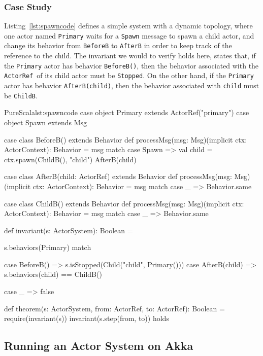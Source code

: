 \documentclass[a4paper,twoside]{article}
\newcommand{\InlineS}[1]{\lstinline[language=PureScala,basicstyle=\small\ttfamily,columns=fixed]|#1|}
\newcommand{\RefCode}[1]{Listing~\ref{#1}}
\newcommand{\ActorRef}{\InlineS{ActorRef}\ }
\newcommand{\stt}[1]{\texttt{\small{#1}}}
\begin{document}
\subsubsection{Case Study}

\RefCode{lst:spawncode} defines a simple system with a dynamic topology, where one actor named \stt{Primary} waits for a \stt{Spawn} message to spawn a child actor, and change its behavior from \stt{BeforeB} to \stt{AfterB} in order to keep track of the reference to the child. The invariant we would to verify holds here, states that, if the \stt{Primary} actor has behavior \stt{BeforeB()}, then the behavior associated with the \ActorRef of its child actor must be \stt{Stopped}. On the other hand, if the \stt{Primary} actor has behavior \stt{AfterB(child)}, then the behavior associated with \stt{child} must be \stt{ChildB}.

\begin{Code}{PureScala}{lst:spawncode}{}
case object Primary extends ActorRef("primary")
case object Spawn extends Msg

case class BeforeB() extends Behavior {
  def processMsg(msg: Msg)(implicit ctx: ActorContext): Behavior = msg match {
    case Spawn =>
      val child = ctx.spawn(ChildB(), "child")
      AfterB(child)
  }
}

case class AfterB(child: ActorRef) extends Behavior {
  def processMsg(msg: Msg)(implicit ctx: ActorContext): Behavior = msg match {
    case _ => Behavior.same
  }
}

case class ChildB() extends Behavior {
  def processMsg(msg: Msg)(implicit ctx: ActorContext): Behavior = msg match {
    case _ => Behavior.same
  }
}

def invariant(s: ActorSystem): Boolean = {
  s.behaviors(Primary) match {
    case BeforeB() =>
      s.isStopped(Child("child", Primary()))
    case AfterB(child) =>
      s.behaviors(child) == ChildB()

    case _ => false
  }
}

def theorem(s: ActorSystem, from: ActorRef, to: ActorRef): Boolean = {
  require(invariant(s))
  invariant(s.step(from, to))
} holds
\end{Code}

\subsection{Running an Actor System on Akka}
\label{akka}
\end{document}
